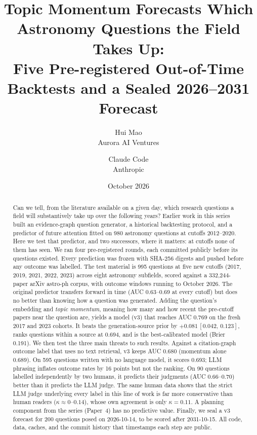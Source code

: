 \documentclass[11pt]{article}
\title{Topic Momentum Forecasts Which Astronomy Questions the Field Takes Up:\\
Five Pre-registered Out-of-Time Backtests and a Sealed 2026--2031 Forecast}
\author{Hui Mao\\ Aurora AI Ventures \and Claude Code\\ Anthropic}
\date{October 2026}
\newcommand{\ci}[2]{\,[#1,\,#2]}
\begin{document}
\maketitle

\begin{abstract}
Can we tell, from the literature available on a given day, which research
questions a field will substantively take up over the following years? Earlier
work in this series built an evidence-graph question generator, a historical
backtesting protocol, and a predictor of future attention fitted on 980
astronomy questions at cutoffs 2012--2020. Here we test that predictor, and two
successors, where it matters: at cutoffs none of them has seen. We ran four
pre-registered rounds, each committed publicly before its questions existed.
Every prediction was frozen with SHA-256 digests and pushed before any outcome
was labelled. The test material is 995 questions at five new cutoffs (2017,
2019, 2021, 2022, 2023) across eight astronomy subfields, scored against a
332,244-paper arXiv astro-ph corpus, with outcome windows running to October
2026. The original predictor transfers forward in time (AUC 0.63--0.69 at every
cutoff) but does no better than knowing how a question was generated. Adding
the question's embedding and \emph{topic momentum}, meaning how many and how
recent the pre-cutoff papers near the question are, yields a model (v3) that
reaches AUC 0.769 on the fresh 2017 and 2023 cohorts. It beats the
generation-source prior by $+0.081\ci{0.042}{0.123}$, ranks questions within a
source at 0.694, and is the best-calibrated model (Brier 0.191). We then test
the three main threats to such results. Against a citation-graph outcome label
that uses no text retrieval, v3 keeps AUC 0.680 (momentum alone 0.689). On 595
questions written with no language model, it scores 0.693; LLM phrasing
inflates outcome rates by 16 points but not the ranking. On 90 questions
labelled independently by two humans, it predicts their judgments (AUC
0.66--0.70) better than it predicts the LLM judge. The same human data shows
that the strict LLM judge underlying every label in this line of work is far
more conservative than human readers ($\kappa\approx0$--$0.14$), whose own
agreement is only $\kappa=0.11$. A planning component from the series (Paper~4)
has no predictive value. Finally, we seal a v3 forecast for 200 questions posed
on 2026-10-14, to be scored after 2031-10-15. All code, data, caches, and the
commit history that timestamps each step are public.
\end{abstract}
\end{document}

